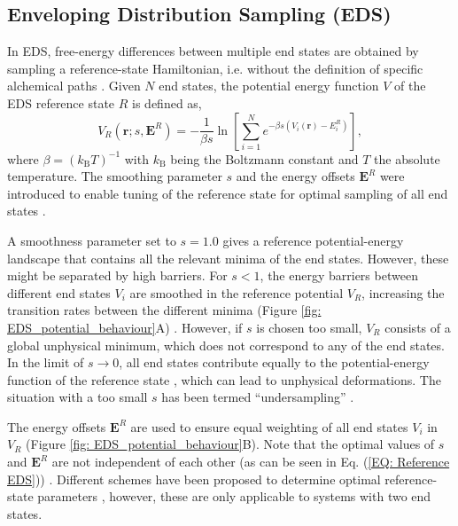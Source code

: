 \label{ch:3Theory}
\subsection{Enveloping Distribution Sampling (EDS)}
In EDS, free-energy differences between multiple end states are obtained by sampling a reference-state Hamiltonian, i.e. without the definition of specific alchemical paths \cite{Christ2007,Christ2008,Riniker2011}. 
Given $N$ end states, the potential energy function $V$ of the EDS reference state $R$ is defined as,
\begin{equation}
    V_R(\textbf{r}; s, \textbf{E}^R)= - \frac{1}{\beta s}\ln \left[ \sum^N_{i=1}{e^{-\beta s \left(V_i(\textbf{r})- E_i^R\right) }} \right] ,
    \label{EQ: Reference EDS}
\end{equation}
where $\beta = (k_\mathrm{B} T)^{-1}$ with $k_\mathrm{B}$ being the Boltzmann constant and $T$ the absolute temperature.
The smoothing parameter $s$ and the energy offsets $\textbf{E}^R$ were introduced to enable tuning of the reference state for optimal sampling of all end states \cite{Christ2007, Christ2008}.

A smoothness parameter set to $s=1.0$ gives a reference potential-energy landscape that contains all the relevant minima of the end states. However, these might be separated by high barriers.
For $s < 1$, the energy barriers between different end states $V_i$ are smoothed in the reference potential $V_R$, increasing the transition rates between the different minima (Figure \ref{fig: EDS_potential_behaviour}A) \cite{Christ2008}. 
However, if $s$ is chosen too small, $V_R$ consists of a global unphysical minimum, which does not correspond to any of the end states. 
In the limit of $s\rightarrow 0$, all end states contribute equally to the potential-energy function of the reference state \cite{Koenig2020}, which can lead to unphysical deformations. The situation with a too small $s$ has been termed ``undersampling'' \cite{Riniker2011}.



The energy offsets $\textbf{E}^R$ are used to ensure equal weighting of all end states $V_i$ in $V_R$ (Figure \ref{fig: EDS_potential_behaviour}B). 
Note that the optimal values of $s$ and $\textbf{E}^R$ are not independent of each other (as can be seen in Eq. (\ref{EQ: Reference EDS})) \cite{Christ2008}.
%
Different schemes have been proposed to determine optimal reference-state parameters \cite{Riniker2011, Christ2009, Hansen2012}, however, these are only applicable to systems with two end states.

